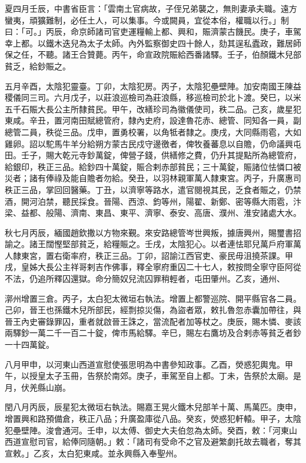\begin{pinyinscope}
 夏四月壬辰，中書省臣言：「雲南土官病故，子侄兄弟襲之，無則妻承夫職。遠方蠻夷，頑獷難制，必任土人，可以集事。今或闕員，宜從本俗，權職以行。」制曰：「可。」丙辰，命京師諸司官吏運糧輸上都、興和，賑濟蒙古饑民。庚子，車駕幸上都。以鐵木迭兒為太子太師。內外監察御史四十餘人，劾其逞私蠹政，難居師保之任，不聽。諸王合贊薨。丙午，命宣政院賑給西番諸驛。壬子，伯顏鐵木兒部貧乏，給鈔賑之。



 五月辛酉，太陰犯靈臺。丁卯，太陰犯房。丙子，太陰犯壘壁陣。加安南國王陳益稷儀同三司。六月戊子，以莊浪巡檢司為莊浪縣，移巡檢司於北卜渡。癸巳，以米五千石賑大長公主所隸貧民。甲午，改繕珍司為徽儀使司，秩二品。己亥，歲星犯東咸。辛丑，置河南田賦總管府，隸內史府，設達魯花赤、總管、同知各一員，副總管二員，秩從三品。戊申，置勇校署，以角牴者隸之。庚戌，大同縣雨雹，大如雞卵。詔以駝馬牛羊分給朔方蒙古民戍守邊徼者，俾牧養蕃息以自贍，仍命議興屯田。壬子，賜大乾元寺鈔萬錠，俾營子錢，供繕修之費，仍升其提點所為總管府，給銀印，秩正三品。給鈔四十萬錠，賑合剌赤部貧民；三十萬錠，賑諸位怯憐口被災者；諸有俸祿及能自贍者勿給。癸丑，以羽林親軍萬人隸東宮。丙子，升廣惠司秩正三品，掌回回醫藥。丁丑，以濟寧等路水，遣官閱視其民，乏食者賑之，仍禁酒，開河泊禁，聽民採食。晉陽、西涼、鈞等州，陽翟、新鄭、密等縣大雨雹，汴梁、益都、般陽、濟南、東昌、東平、濟寧、泰安、高唐、濮州、淮安諸處大水。



 秋七月丙辰，緬國趙欽撒以方物來覲。來安路總管岑世興叛，據唐興州，賜璽書招諭之。諸王闊慳堅部貧乏，給糧賑之。壬戌，太陰犯心。以者連怯耶兒萬戶府軍萬人隸東宮，置右衛率府，秩正三品。丁卯，詔諭江西官吏、豪民毋沮撓茶課。甲戌，皇姊大長公主祥哥剌吉作佛事，釋全寧府重囚二十七人，敕按問全寧守臣阿從不法，仍追所釋囚還獄。命分簡奴兒流囚罪稍輕者，屯田肇州。乙亥，通州、



 漷州增置三倉。丙子，太白犯太微垣右執法。增置上都警巡院、開平縣官各二員。己卯，晉王也孫鐵木兒所部民，經剽掠災傷，為盜者眾，敕扎魯忽赤囊加帶往，與晉王內史審錄罪囚，重者就啟晉王誅之，當流配者加等杖之。庚辰，賜木憐、麥該兩驛鈔一萬二千一百二十錠，俾市馬給驛。辛巳，賜左右鷹坊及合剌赤等貧乏者鈔一十四萬錠。



 八月甲申，以河東山西道宣慰使張思明為中書參知政事。乙酉，熒惑犯輿鬼。甲午，以授皇太子玉冊，告祭於南郊。庚子，車駕至自上都。丁未，告祭於太廟。是月，伏羌縣山崩。



 閏八月丙辰，辰星犯太微垣右執法。賜嘉王晃火鐵木兒部羊十萬、馬萬匹。庚申，增置興和路預備倉，秩正八品；升廣盈庫從八品。癸亥，熒惑犯軒轅。甲子，太陰犯壘壁陣。浚會通河。壬申，以太傅、御史大夫伯忽為太師。癸酉，敕：「河東山西道宣慰司官，給俸同隨朝。」敕：「諸司有受命不之官及避繁劇托故去職者，奪其宣敕。」乙亥，太白犯東咸。並永興縣入奉聖州。




\end{pinyinscope}
